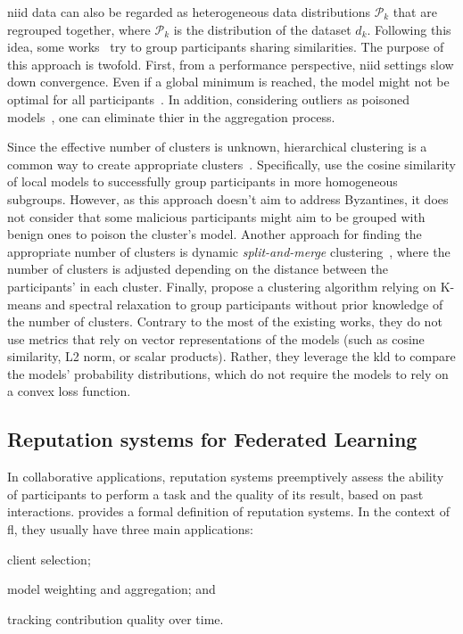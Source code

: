 \Gls{niid} data can also be regarded as heterogeneous data distributions $\mathcal{P}_k$ that are regrouped together, where $\mathcal{P}_k$ is the distribution of the dataset $d_k$.
Following this idea, some works~\cite{briggs_Federatedlearninghierarchical_2020,ouyang_ClusterFLClusteringbasedFederated_2022,ye_PFedSAPersonalizedFederated_2023} try to group participants sharing similarities. 
The purpose of this approach is twofold.
First, from a performance perspective, \gls{niid} settings slow down convergence.
Even if a global minimum is reached, the model might not be optimal for all participants~\cite{kairouz_AdvancesOpenProblems_2021,ouyang_ClusterFLClusteringbasedFederated_2022}.
In addition, considering outliers as poisoned models~\cite{peri_DeepkNNDefense_2020}, one can eliminate thier in the aggregation process.

Since the effective number of clusters is unknown, hierarchical clustering is a common way to create appropriate clusters~\cite{briggs_Federatedlearninghierarchical_2020,ye_PFedSAPersonalizedFederated_2023}. 
Specifically, \textcite{ye_PFedSAPersonalizedFederated_2023} use the cosine similarity of local models to successfully group participants in more homogeneous subgroups.
However, as this approach doesn't aim to address Byzantines, it does not consider that some malicious participants might aim to be grouped with benign ones to poison the cluster's model.
Another approach for finding the appropriate number of clusters is dynamic \emph{split-and-merge} clustering~\cite{chen_ZeroKnowledgeClustering_2021}, where the number of clusters is adjusted depending on the distance between the participants' in each cluster.
Finally, \textcite{ouyang_ClusterFLClusteringbasedFederated_2022} propose a clustering algorithm relying on K-means and spectral relaxation to group participants without prior knowledge of the number of clusters.
Contrary to the most of the existing works, they do not use metrics that rely on vector representations of the models (such as cosine similarity, L2 norm, or scalar products).
Rather, they leverage the \gls{kld} to compare the models' probability distributions, which do not require the models to rely on a convex loss function.


\subsection{Reputation systems for Federated Learning\label{sec:radar.related.reputation}}

In collaborative applications, reputation systems preemptively assess the ability of participants to perform a task and the quality of its result, based on past interactions.
 provides a formal definition of reputation systems.
In the context of \gls{fl}, they usually have three main applications:
  \begin{enumerate*}[(i)]
      \item client selection;
      \item model weighting and aggregation; and
      \item tracking contribution quality over time.
  \end{enumerate*}



